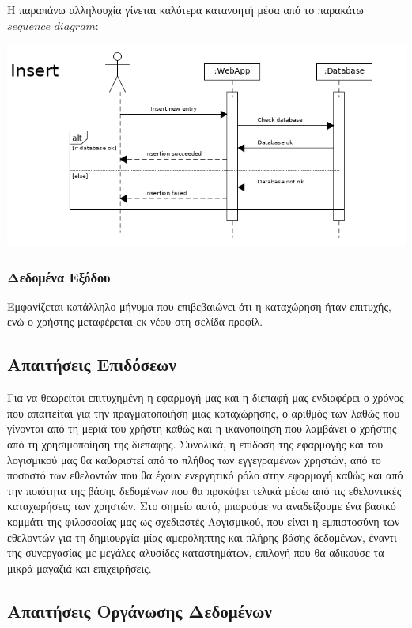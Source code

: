 \documentclass[12pt]{article}
\begin{document}
Η παραπάνω αλληλουχία γίνεται καλύτερα κατανοητή μέσα από το παρακάτω $sequence$ $diagram$:

\begin{center}
\includegraphics[scale=0.5]{UML/insertSequence.png}
\end{center}

\subsubsection{Δεδομένα Εξόδου}

Εμφανίζεται κατάλληλο μήνυμα που επιβεβαιώνει ότι η καταχώρηση ήταν επιτυχής, ενώ ο χρήστης μεταφέρεται εκ νέου στη σελίδα προφίλ.

\subsection{Απαιτήσεις Επιδόσεων}

Για να θεωρείται επιτυχημένη η εφαρμογή μας και η διεπαφή μας ενδιαφέρει ο χρόνος που απαιτείται για την πραγματοποιήση μιας καταχώρησης, ο αριθμός των λαθώς που γίνονται από τη μεριά του χρήστη καθώς και η ικανοποίηση που λαμβάνει ο χρήστης από τη χρησιμοποίηση της διεπάφης. Συνολικά, η επίδοση της εφαρμογής και του λογισμικού μας θα καθοριστεί από το πλήθος των εγγεγραμένων χρηστών, από το ποσοστό των εθελοντών που θα έχουν ενεργητικό ρόλο στην εφαρμογή καθώς και από την ποιότητα της βάσης δεδομένων που θα προκύψει τελικά μέσω από τις εθελοντικές καταχωρήσεις των χρηστών. Στο σημείο αυτό, μπορούμε να αναδείξουμε ένα βασικό κομμάτι της φιλοσοφίας μας ως σχεδιαστές Λογισμικού, που είναι η εμπιστοσύνη των εθελοντών για τη δημιουργία μίας αμερόληπτης και πλήρης βάσης δεδομένων, έναντι της συνεργασίας με μεγάλες αλυσίδες καταστημάτων, επιλογή που θα αδικούσε τα μικρά μαγαζιά και επιχειρήσεις. 


\subsection{Απαιτήσεις Οργάνωσης Δεδομένων}
\end{document}
